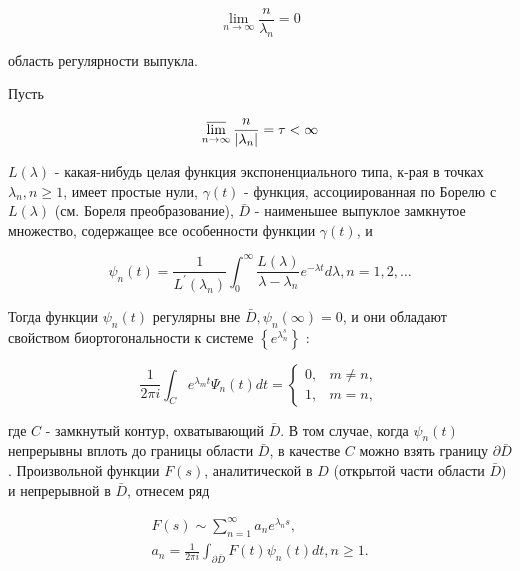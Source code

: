 \documentclass[10pt]{article}
\begin{document}
\[

\lim _{n \rightarrow \infty} \frac{n}{\lambda_{n}}=0

\]



область регулярности выпукла.



Пусть



\[

\varlimsup_{n \rightarrow \infty} \frac{n}{\left|\lambda_{n}\right|}=\tau<\infty

\]



$L(\lambda)$ - какая-нибудь целая функция экспоненциального типа, к-рая в точках $\lambda_{n}, n \geqslant 1$, имеет простые нули, $\gamma(t)$ - функция, ассоциированная по Борелю с $L(\lambda)$ (см. Бореля преобразование), $\bar{D}$ - наименьшее выпуклое замкнутое множество, содержащее все особенности функции $\gamma(t)$, и



\[

\psi_{n}(t)=\frac{1}{L^{\prime}\left(\lambda_{n}\right)} \int_{0}^{\infty} \frac{L(\lambda)}{\lambda-\lambda_{n}} e^{-\lambda t} d \lambda, n=1,2, \ldots

\]



Тогда функции $\psi_{n}(t)$ регулярны вне $\bar{D}, \psi_{n}(\infty)=0$, и они обладают свойством биортогональности к системе $\left\{e^{\lambda_{n}^{s}}\right\}$ :



\[

\frac{1}{2 \pi i} \int_{C} e^{\lambda_{m} t} \Psi_{n}(t) d t= \begin{cases}0, & m \neq n, \\ 1, & m=n,\end{cases}

\]



где $C$ - замкнутый контур, охватывающий $\bar{D}$. В том случае, когда $\psi_{n}(t)$ непрерывны вплоть до границы области $\bar{D}$, в качестве $C$ можно взять границу $\partial \bar{D}$. Произвольной функции $F(s)$, аналитической в $D$ (открытой части области $\bar{D})$ и непрерывной в $\bar{D}$, отнесем ряд



\[

\begin{gathered}

F(s) \sim \sum_{n=1}^{\infty} a_{n} e^{\lambda_{n} s}, \\

a_{n}=\frac{1}{2 \pi i} \int_{\partial \bar{D}} F(t) \psi_{n}(t) d t, n \geqslant 1 .

\end{gathered}

\]
\end{document}
